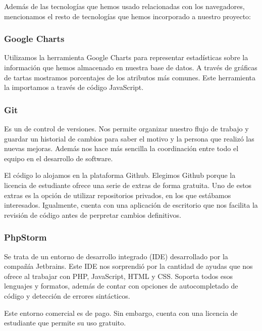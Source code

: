 Además de las tecnologías que hemos usado relacionadas con los navegadores, mencionamos el resto de tecnologías que hemos incorporado a nuestro proyecto: \par 

\subsubsection{Google Charts}

Utilizamos la herramienta Google Charts\cite{GoogleCharts} para representar estadísticas sobre la información que hemos almacenado en nuestra base de datos. A través de gráficas de tartas mostramos porcentajes de los atributos más comunes. Este herramienta la importamos a través de código JavaScript. \par 

\subsubsection{Git}

Es un  de control de versiones. Nos permite organizar nuestro flujo de trabajo y guardar un historial de cambios para saber el motivo y la persona que realizó las nuevas mejoras. Además nos hace más sencilla la coordinación entre todo el equipo en el desarrollo de software. \par 

El código lo alojamos en la plataforma Github. Elegimos Github porque la licencia de estudiante ofrece una serie de extras de forma gratuita. Uno de estos extras es la opción de utilizar repositorios privados, en los que estábamos interesados. Igualmente, cuenta con una aplicación de escritorio que nos facilita la revisión de código antes de perpretar cambios definitivos. \par 

\subsubsection{PhpStorm}

Se trata de un entorno de desarrollo integrado (IDE) desarrollado por la compañía Jetbrains. Este IDE nos sorprendió por la cantidad de ayudas que nos ofrece al trabajar con PHP, JavaScript, HTML y CSS. Soporta todos esos lenguajes y formatos, además de contar con opciones de autocompletado de código y detección de errores sintácticos. \par 

Este entorno comercial es de pago. Sin embargo, cuenta con una licencia de estudiante que permite su uso gratuito. \par 

